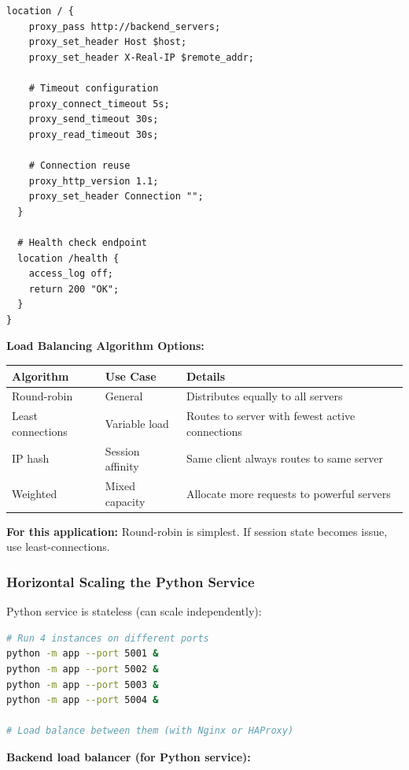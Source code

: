 \documentclass[12pt,a4paper,oneside]{article}
\begin{document}
{{\begin{lstlisting}[language=nginx, caption=Nginx Load Balancer Config]
  location / {
    proxy_pass http://backend_servers;
    proxy_set_header Host $host;
    proxy_set_header X-Real-IP $remote_addr;
    
    # Timeout configuration
    proxy_connect_timeout 5s;
    proxy_send_timeout 30s;
    proxy_read_timeout 30s;
    
    # Connection reuse
    proxy_http_version 1.1;
    proxy_set_header Connection "";
  }
  
  # Health check endpoint
  location /health {
    access_log off;
    return 200 "OK";
  }
}
\end{lstlisting}

\textbf{Load Balancing Algorithm Options:}

\begin{table}[H]
\centering
\begin{tabular}{|p{2.5cm}|p{2cm}|p{7.5cm}|}
\hline
\textbf{Algorithm} & \textbf{Use Case} & \textbf{Details} \\
\hline
Round-robin & General & Distributes equally to all servers \\
\hline
Least connections & Variable load & Routes to server with fewest active connections \\
\hline
IP hash & Session affinity & Same client always routes to same server \\
\hline
Weighted & Mixed capacity & Allocate more requests to powerful servers \\
\hline
\end{tabular}
\end{table}

\textbf{For this application:} Round-robin is simplest. If session state becomes issue, use least-connections.

\subsubsection{Horizontal Scaling the Python Service}

Python service is stateless (can scale independently):

\begin{lstlisting}[language=bash, caption=Scale Python Service]
# Run 4 instances on different ports
python -m app --port 5001 &
python -m app --port 5002 &
python -m app --port 5003 &
python -m app --port 5004 &

# Load balance between them (with Nginx or HAProxy)
\end{lstlisting}

\textbf{Backend load balancer (for Python service):}

}}
\end{document}
